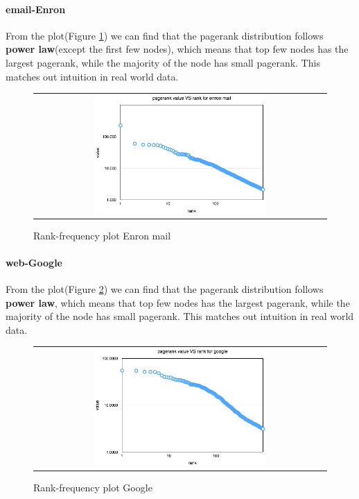 \paragraph{email-Enron}
From the plot(Figure \ref{t2:enron}) we can find that the pagerank distribution follows {\bf power law}(except the first few nodes), which means that top few nodes has the largest pagerank, while the majority of the node has small pagerank. This matches out intuition in real world data. 
\begin{figure}[!htbf]
\begin{center}
\begin{tabular}{c}
    \includegraphics[width=0.6\textwidth]{FIG/t2_enron.png}
\end{tabular}
\caption{Rank-frequency plot Enron mail}
\label{t2:enron}
\end{center}
\end{figure}

\paragraph{web-Google}
From the plot(Figure \ref{t2:google}) we can find that the pagerank distribution follows {\bf power law}, which means that top few nodes has the largest pagerank, while the majority of the node has small pagerank. This matches out intuition in real world data. 
\begin{figure}[!htbf]
\begin{center}
\begin{tabular}{c}
    \includegraphics[width=0.6\textwidth]{FIG/t2_google.png}
\end{tabular}
\caption{Rank-frequency plot Google}
\label{t2:google}
\end{center}
\end{figure}

